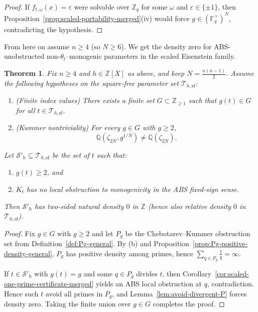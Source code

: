 \documentclass[11pt,letterpaper]{amsart}
\newcommand{\Z}{\mathbb{Z}}
\newcommand{\Q}{\mathbb{Q}}
\newcommand{\F}{\mathbb{F}}
\theoremstyle{plain}
\newtheorem{theorem}{Theorem}[section]
\theoremstyle{definition}
\theoremstyle{remark}
\theoremstyle{plain}
\begin{document}
\begin{proof}
If $f_{t,\omega}(x)=\varepsilon$ were solvable over $\Z_q$ for some $\omega$ and $\varepsilon\in\{\pm1\}$,
then Proposition~\ref{prop:scaled-portability-merged}(iv) would force $g\in(\F_q^\times)^N$,
contradicting the hypothesis.
\end{proof}


From here on assume $n\ge 4$ (so $N\ge 6$). We get the density zero for \textsc{ABS}-unobstructed non-$\theta_t$--monogenic parameters in the scaled Eisenstein family.

\begin{theorem}
\label{thm:scaled-density-zero-merged}
Fix $n\ge 4$ and $h\in\Z[X]$ as above, and keep $N=\frac{n(n-1)}2$.
Assume the following hypotheses on the square-free parameter set $\mathcal{T}_{h,\mathrm{sf}}$:
\begin{enumerate}[label=\textup{(\alph*)}]
\item \textup{(Finite index values)} There exists a finite set $G\subset\Z_{\ge1}$ such that
$g(t)\in G$ for all $t\in\mathcal{T}_{h,\mathrm{sf}}$.
\item \textup{(Kummer nontriviality)} For every $g\in G$ with $g\ge 2$,
\[
\Q(\zeta_{2N},g^{1/N})\neq \Q(\zeta_{2N}).
\]
\end{enumerate}
Let $\mathcal{S}'_{h}\subseteq\mathcal{T}_{h,\mathrm{sf}}$ be the set of $t$ such that:
\begin{enumerate}[label=\textup{(\roman*)}]
\item $g(t)\ge 2$, and
\item $K_t$ has \emph{no} local obstruction to monogenicity in the \textsc{ABS} fixed-sign sense.
\end{enumerate}
Then $\mathcal{S}'_{h}$ has two-sided natural density $0$ in $\Z$ (hence also relative density $0$
in $\mathcal{T}_{h,\mathrm{sf}}$).
\end{theorem}

\begin{proof}
Fix $g\in G$ with $g\ge 2$ and let $P_g$ be the Chebotarev--Kummer obstruction set
from Definition~\ref{def:Pg-general}.  By \textup{(b)} and Proposition~\ref{prop:Pg-positive-density-general},
$P_g$ has positive density among primes, hence $\sum_{q\in P_g}\frac1q=\infty$.

If $t\in\mathcal{S}'_h$ with $g(t)=g$ and some $q\in P_g$ divides $t$, then
Corollary~\ref{cor:scaled-one-prime-certificate-merged} yields an \textsc{ABS} local obstruction at $q$,
contradiction.  Hence such $t$ avoid all primes in $P_g$, and Lemma~\ref{lem:avoid-divergent-P}
forces density zero.  Taking the finite union over $g\in G$ completes the proof.
\end{proof}
\end{document}
